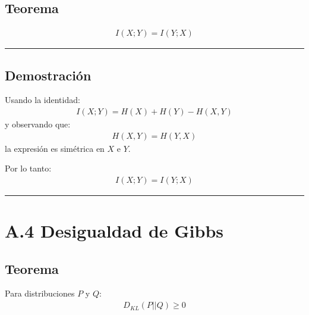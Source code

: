 \documentclass[letterpaper,10pt,english]{jupyterBook}
\begin{document}
\subsection{Teorema}
\label{\detokenize{05_appendices/proofs:id3}}\begin{equation*}
\begin{split}
I(X;Y)=I(Y;X)
\end{split}
\end{equation*}

\bigskip\hrule\bigskip



\subsection{Demostración}
\label{\detokenize{05_appendices/proofs:id4}}
\sphinxAtStartPar
Usando la identidad:
\begin{equation*}
\begin{split}
I(X;Y)=H(X)+H(Y)-H(X,Y)
\end{split}
\end{equation*}
\sphinxAtStartPar
y observando que:
\begin{equation*}
\begin{split}
H(X,Y)=H(Y,X)
\end{split}
\end{equation*}
\sphinxAtStartPar
la expresión es simétrica en \(X\) e \(Y\).

\sphinxAtStartPar
Por lo tanto:
\begin{equation*}
\begin{split}
I(X;Y)=I(Y;X)
\end{split}
\end{equation*}

\bigskip\hrule\bigskip



\section{A.4 Desigualdad de Gibbs}
\label{\detokenize{05_appendices/proofs:a-4-desigualdad-de-gibbs}}

\subsection{Teorema}
\label{\detokenize{05_appendices/proofs:id5}}
\sphinxAtStartPar
Para distribuciones \(P\) y \(Q\):
\begin{equation*}
\begin{split}
D_{KL}(P||Q)\ge0
\end{split}
\end{equation*}
\end{document}
